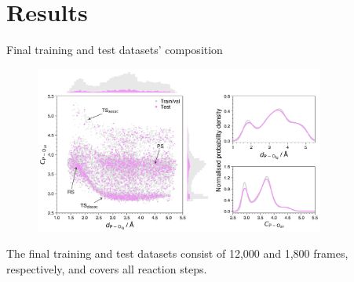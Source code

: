 \documentclass[11pt,t]{beamer}
\begin{document}
\section{Results}
\begin{frame}{Final training and test datasets' composition}
	\vspace{-10pt}
	\begin{figure}
		\centering
		\includegraphics[width=0.85\textwidth]{Figures/results_final_dataset_with_histograms.png}
	\end{figure}
	\small
	The final training and test datasets consist of 12,000 and 1,800 frames, respectively, and covers all reaction steps.
\end{frame}
\end{document}
